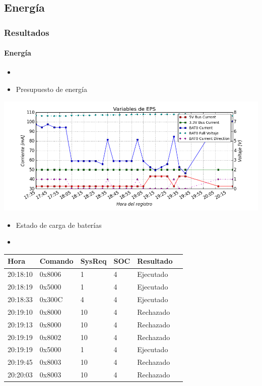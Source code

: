 \documentclass[xcolor=dvipsnames]{beamer}
\begin{document}
    \subsection{Energía}
    \begin{frame}[allowframebreaks]
        \frametitle{Resultados}
        \framesubtitle{Energía}
        
        \begin{itemize}
            \item {}
            \item Presupuesto de energía
        \end{itemize}
                
        \begin{center}
            \includegraphics[height=0.65\textheight]{img/plot_eps_var.png}
        \end{center}
        
        \begin{itemize}
            \item Estado de carga de baterías
            \item {}
        \end{itemize}
        
        \small
        \begin{table}[b]
        \centering
        \begin{tabular}{llllll}
        \hline
        \textbf{Hora} & \textbf{Comando} & \textbf{SysReq} & \textbf{SOC} & \textbf{Resultado} \\ \hline
        20:18:10 & 0x8006 &  1 & 4  & Ejecutado \\
        20:18:19 & 0x5000 &  1 & 4  & Ejecutado \\
        20:18:33 & 0x300C &  4 & 4  & Ejecutado \\
        20:19:10 & 0x8000 & 10 & 4  & Rechazado \\
        20:19:13 & 0x8000 &  10 & 4  & Rechazado \\
        20:19:19 & 0x8002 &  10 & 4  & Rechazado \\
        20:19:19 & 0x5000 &  1 & 4  & Ejecutado \\
        20:19:45 & 0x8003 &  10 & 4  & Rechazado \\
        20:20:03 & 0x8003 &  10 & 4  & Rechazado \\ \hline
        \end{tabular} \label{ch5:table:test_soc}
        \end{table}

    \end{frame}
    
\end{document}

